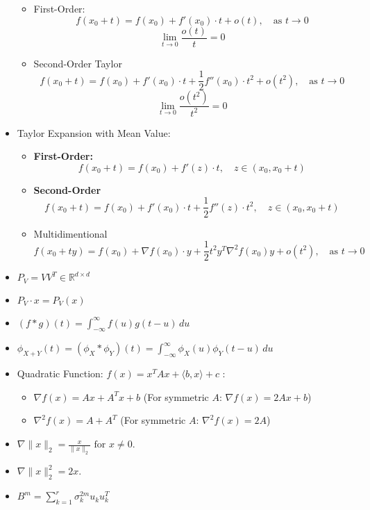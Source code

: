 \documentclass{article}
\begin{document}
\begin{itemize}
\begin{itemize}
\item First-Order:
\[
f(x_0 + t) = f(x_0) + f'(x_0) \cdot t + o(t), \quad \text{as } t \to 0
\]
\[
\lim_{t \to 0} \frac{o(t)}{t} = 0
\]

\item Second-Order Taylor
   \[
        f(x_0 + t) = f(x_0) + f'(x_0) \cdot t + \frac{1}{2} f''(x_0) \cdot t^2 + o(t^2), \quad \text{as } t \to 0
        \]
    \[
        \lim_{t \to 0} \frac{o(t^2)}{t^2} = 0
        \]
\end{itemize}

\item Taylor Expansion with Mean Value:
\begin{itemize}
    \item \textbf{First-Order:}
    \[
    f(x_0 + t) = f(x_0) + f'(z) \cdot t, \quad z \in (x_0, x_0 + t)
    \]

    \item \textbf{Second-Order }
    \[
    f(x_0 + t) = f(x_0) + f'(x_0) \cdot t + \frac{1}{2} f''(z) \cdot t^2, \quad z \in (x_0, x_0 + t)
    \]

    \item Multidimentional 
    \[
f(x_0 + ty) = f(x_0) + \nabla f(x_0) \cdot y + \frac{1}{2} t^2 y^T \nabla^2 f(x_0) y + o(t^2), \quad \text{as } t \to 0
\]
\end{itemize}

\item  $
    P_V = V V^T \in \mathbb{R}^{d \times d}
    $
\item   $
    P_V \cdot x = P_V(x)
    $
\item $
(f * g)(t) = \int_{-\infty}^{\infty} f(u)g(t - u) \, du
$

\item $
\phi_{X+Y}(t) = \left( \phi_X * \phi_Y \right)(t) = \int_{-\infty}^{\infty} \phi_X(u)\phi_Y(t - u) \, du
$



\item Quadratic Function: $
f(x) = x^T A x + \langle b, x \rangle + c
$ :

\begin{itemize}
    \item $
\nabla f(x) = Ax + A^T x + b
$
(For symmetric \(A\): \(\nabla f(x) = 2Ax + b\))
\item $
\nabla^2 f(x) = A + A^T
$
(For symmetric \(A\): \(\nabla^2 f(x) = 2A\))

\end{itemize}

\item $
\nabla \|x\|_2 = \frac{x}{\|x\|_2} \text{ for } x \neq 0.
$

\item $
\nabla \|x\|^2_2 = 2x.
$

\item $
B^m = \sum_{k=1}^{r} \sigma_k^{2m} u_k u_k^T
$

\end{itemize}
\end{document}
